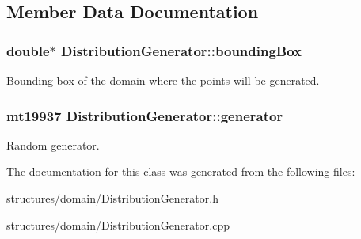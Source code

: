 \subsection{Member Data Documentation}
\subsubsection[{\texorpdfstring{bounding\+Box}{boundingBox}}]{\setlength{\rightskip}{0pt plus 5cm}double$\ast$ Distribution\+Generator\+::bounding\+Box\hspace{0.3cm}{\ttfamily [protected]}}\hypertarget{class_distribution_generator_abbb670b1d48a4820559097b85bf6ee2d}{}\label{class_distribution_generator_abbb670b1d48a4820559097b85bf6ee2d}
Bounding box of the domain where the points will be generated. 
\subsubsection[{\texorpdfstring{generator}{generator}}]{\setlength{\rightskip}{0pt plus 5cm}mt19937 Distribution\+Generator\+::generator\hspace{0.3cm}{\ttfamily [protected]}}\hypertarget{class_distribution_generator_a875697de8d5c0a4d18e473e483a9646c}{}\label{class_distribution_generator_a875697de8d5c0a4d18e473e483a9646c}
Random generator. 

The documentation for this class was generated from the following files\+:\begin{DoxyCompactItemize}
\item 
structures/domain/Distribution\+Generator.\+h\item 
structures/domain/Distribution\+Generator.\+cpp\end{DoxyCompactItemize}

